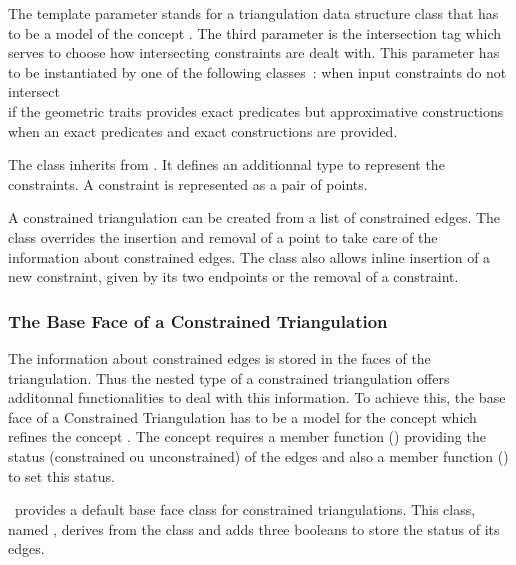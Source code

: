 The template parameter 
stands for 
a triangulation data structure class that has to be a model
of the concept .
The third parameter  is the intersection tag
which serves to choose how intersecting constraints
are dealt with. This parameter has to be instantiated
by one of the following classes~:
 when input constraints do not
intersect \\
 if the geometric traits provides
exact predicates but approximative constructions \\
 when an exact predicates
and exact constructions are provided.

The class 
inherits from .
It defines an additionnal type 
to represent the constraints. A
constraint is represented as a pair of points.

A  constrained triangulation can be created
from a
list of constrained edges.
The class 
overrides the insertion and removal of a point to take care of the
information about constrained edges. The class also allows inline
insertion of a new constraint, given by its two endpoints
or the removal of a constraint.

\subsubsection{The Base Face of a Constrained Triangulation}
 The information about constrained edges is stored in the 
faces of the triangulation. Thus the nested 
type of a constrained triangulation offers
additonnal functionalities to deal with this information.
To achieve this, the base face of a Constrained Triangulation
has to be a model for the concept 
which refines the concept .
The concept 
requires  a member function
()
 providing the status
(constrained ou unconstrained) of the edges
and also a member function 
() to set this status.


\cgal\ provides a default base face class
for constrained triangulations. This class, named
,
derives from the class
and adds three booleans to store the status of its edges. 

